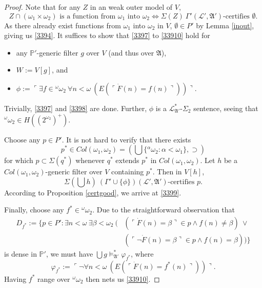 \documentclass[12pt]{article}
\numberwithin{equation}{section}
\begin{document}
\begin{proof}
Note that for any $Z$ in an weak outer model of $V$, 
\begin{equation*}
    Z \cap (\omega_1 \times \omega_2) \text{ is a function from } \omega_1 \text{ into } \omega_2 \iff \Sigma(Z) \ \Gamma'(\mathcal{L}', \mathfrak{A}') \text{-certifies } \emptyset \text{.}
\end{equation*}
As there already exist functions from $\omega_1$ into $\omega_2$ in $V$, $\emptyset \in P'$ by Lemma \ref{inout}, giving us \ref{3394}. It suffices to show that \ref{3397} to \ref{33910} hold for
\begin{itemize}
    \item any $\mathbb{P}'$-generic filter $g$ over $V$ (and thus over $\mathfrak{A}$),
    \item $W := V[g]$, and
    \item $\phi := \ulcorner \exists f \in {^{\omega}{\omega_2}} \ \forall n < \omega \ (E(\ulcorner \dot{F}(n) = f(n) \urcorner)) \urcorner$.
\end{itemize}
Trivially, \ref{3397} and \ref{3398} are done. Further, $\phi$ is a $\mathcal{L}^{*}_{\mathfrak{A}'}$-$\Sigma_2$ sentence, seeing that ${^{\omega}{\omega_2}} \in H((2^{\omega_2})^+)$.

Choose any $p \in P'$. It is not hard to verify that there exists 
\begin{equation*}
    p^* \in Col(\omega_1, \omega_2) = (\bigcup \{{^{\alpha}{\omega_2}} : \alpha < \omega_1\}, \supset)
\end{equation*} 
for which $p \subset \Sigma(q^*)$ whenever $q^*$ extends $p^*$ in $Col(\omega_1, \omega_2)$. Let $h$ be a $Col(\omega_1, \omega_2)$-generic filter over $V$ containing $p^*$. Then in $V[h]$, 
\begin{equation*}
    \Sigma(\bigcup h) \ (\Gamma' \cup \{\phi\})(\mathcal{L}', \mathfrak{A}') \text{-certifies } p \text{.}
\end{equation*}
According to Proposition \ref{certgood}, we arrive at \ref{3399}.

Finally, choose any $f^* \in {^{\omega}{\omega_2}}$. Due to the straightforward observation that 
\begin{align*}
    D_{f^*} := \{p \in P' : \exists n < \omega \ \exists \beta < \omega_2 \ ( & (\ulcorner \dot{F}(n) = \beta \urcorner \in p \wedge f(n) \neq \beta) \ \vee \\
    & (\ulcorner \neg \dot{F}(n) = \beta \urcorner \in p \wedge f(n) = \beta))\}
\end{align*}
is dense in $\mathbb{P}'$, we must have $\bigcup g \models^{*}_{\mathfrak{A}'} \varphi_{f^*}$, where
\begin{equation*}
    \varphi_{f^*} := \ulcorner \neg \forall n < \omega \ (E(\ulcorner \dot{F}(n) = f^*(n) \urcorner)) \urcorner \text{.}
\end{equation*}
Having $f^*$ range over ${^{\omega}{\omega_2}}$ then nets us \ref{33910}.
\end{proof}
\end{document}
